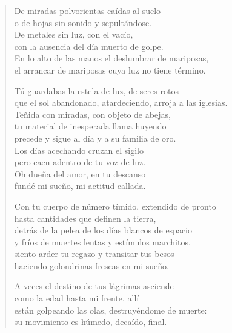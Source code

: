 \documentclass[12pt]{article}
\begin{document}
\clearpage
{}
\begin{verse}

De miradas polvorientas caídas al suelo\\
o de hojas sin sonido y sepultándose.\\
De metales sin luz, con el vacío,\\
con la ausencia del día muerto de golpe.\\
En lo alto de las manos el deslumbrar de mariposas,\\
el arrancar de mariposas cuya luz no tiene término.  

Tú guardabas la estela de luz, de seres rotos\\
que el sol abandonado, atardeciendo, arroja a las iglesias.\\
Teñida con miradas, con objeto de abejas,\\
tu material de inesperada llama huyendo\\
precede y sigue al día y a su familia de oro.\\
Los días acechando cruzan el sigilo\\
pero caen adentro de tu voz de luz.\\
Oh dueña del amor, en tu descanso\\
fundé mi sueño, mi actitud callada.  

Con tu cuerpo de número tímido, extendido de pronto\\
hasta cantidades que definen la tierra,\\
detrás de la pelea de los días blancos de espacio\\
y fríos de muertes lentas y estímulos marchitos,\\
siento arder tu regazo y transitar tus besos\\
haciendo golondrinas frescas en mi sueño.  

A veces el destino de tus lágrimas asciende\\
como la edad hasta mi frente, allí\\
están golpeando las olas, destruyéndome de muerte:\\
su movimiento es húmedo, decaído, final.

\end{verse}
\end{document}
